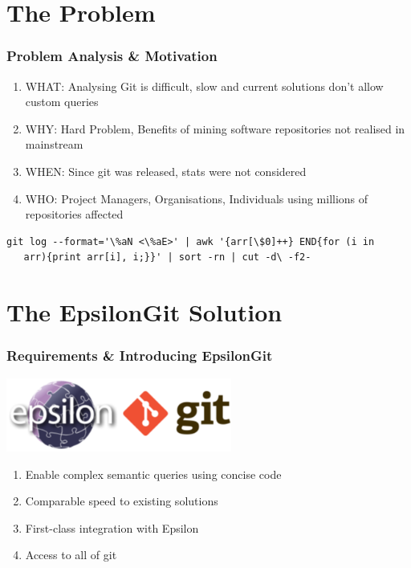 \documentclass[aspectratio=1610]{beamer}
\begin{document}
\section{The Problem}
\begin{frame}[containsverbatim]
	\frametitle{Problem Analysis \& Motivation}
	\begin{enumerate}
		\item WHAT: Analysing Git is difficult, slow and current solutions don't allow custom queries
		\item WHY: Hard Problem, Benefits of mining software repositories not realised in mainstream
		\item WHEN: Since git was released, stats were not considered
		\item WHO: Project Managers, Organisations, Individuals using millions of repositories affected
	\end{enumerate}
	\vspace{1cm}
	\begin{lstlisting}[caption=A gruesome custom query using Git Bash to list authors by number of commits, label=lst:exampleCode]
	git log --format='\%aN <\%aE>' | awk '{arr[\$0]++} END{for (i in
   arr){print arr[i], i;}}' | sort -rn | cut -d\ -f2-
	\end{lstlisting}
\end{frame}

\section{The EpsilonGit Solution}
\begin{frame}
	\frametitle{Requirements \& Introducing EpsilonGit}
	\begin{center}
		\includegraphics[width=280px]{images/epsilon-git}
	\end{center}
	\begin{enumerate}
		\item Enable complex semantic queries using concise code
		\item Comparable speed to existing solutions
		\item First-class integration with Epsilon
		\item Access to all of git
	\end{enumerate}
\end{frame}
\end{document}
